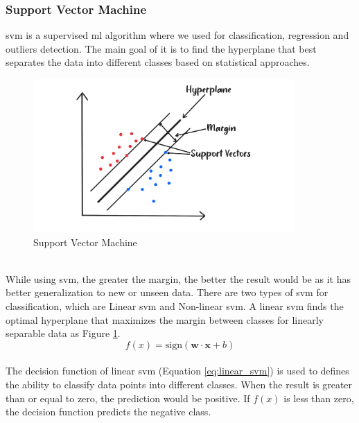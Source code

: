 \subsubsection{Support Vector Machine}
\nocite{berwick_an}
\nocite{_14}
\nocite{saini_2021_support}
\gls{svm} is a supervised \gls{ml} algorithm where we used for classification, regression and outliers detection.
The main goal of it is to find the hyperplane that best separates the data into different classes based on statistical approaches. \cite{gron_2019_handson}
\\
\begin{figure}[!ht]
    \centering
    \includegraphics[width=10cm]{Images/svm.png}
    \caption{Support Vector Machine}
    \label{fig:svm}
\end{figure}
\\
\indent While using \gls{svm}, the greater the margin, the better the result would be as it has better generalization to new or unseen data. 
There are two types of \gls{svm} for classification, which are Linear \gls{svm} and Non-linear \gls{svm}.
A linear \gls{svm} finds the optimal hyperplane that maximizes the margin between classes for linearly separable data as Figure \ref{fig:svm}.
\\
\begin{equation} \label{eq:linear_svm}
    f(x) = \text{sign}(\mathbf{w} \cdot \mathbf{x} + b)
\end{equation}
\\
The decision function of linear \gls{svm} (Equation \ref{eq:linear_svm}) is used to defines the ability to classify data points into different classes.
When the result is greater than or equal to zero, the prediction would be positive. If $f(x)$ is less than zero, the decision function predicts the negative class. 
